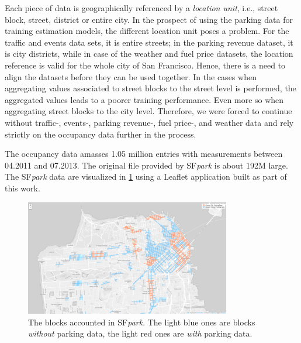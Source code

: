 	Each piece of data is geographically referenced by a \textit{location unit}, i.e., street block, street, district or entire city. In the prospect of using the parking data for training estimation models, the different location unit poses a problem. For the traffic and events data sets, it is entire streets; in the parking revenue dataset, it is city districts, while in case of the weather and fuel price datasets, the location reference is valid for the whole city of San Francisco. Hence, there is a need to align the datasets before they can be used together. In the cases when aggregating values associated to street blocks to the street level is performed, the aggregated values leads to a poorer training performance. Even more so when aggregating street blocks to the city level. Therefore, we were forced to continue without traffic-, events-, parking revenue-, fuel price-, and weather data and rely strictly on the occupancy data further in the process.
	
	The occupancy data amasses 1.05 million entries with measurements between 04.2011 and 07.2013. The original file provided by SF\textit{park} is about 192M large. The SF\textit{park} data are visualized in \cref{fig:before_clustering} using a Leaflet application built as part of this work.
	
	\begin{figure}[!ht]
		\centering
		\includegraphics[width=0.8\textwidth]{graphics/initial_view_before_clusteringV7.png}
		\caption{The blocks accounted in SF\textit{park}. The light blue ones are blocks \textit{without} parking data, the light red ones are \textit{with} parking data.}
		\label{fig:before_clustering}
	\end{figure}
		
